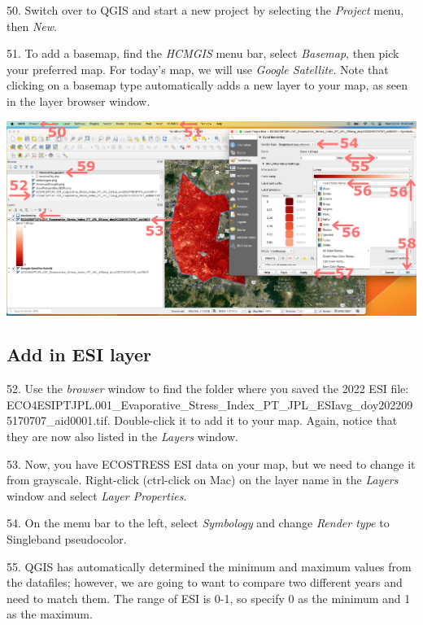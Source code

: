 \documentclass[oneside,a4paper,11pt,explicit]{book}
\begin{document}
50. Switch over to QGIS and start a new project by selecting the \textit{Project} menu, then \textit{New}.

51. To add a basemap, find the \textit{HCMGIS} menu bar, select \textit{Basemap}, then pick your preferred map. For today's map, we will use \textit{Google Satellite}. Note that clicking on a basemap type automatically adds a new layer to your map, as seen in the layer browser window.

\vspace{.5em}

\centerline{\includegraphics[width=\textwidth]{addESIlayer.png}}

\subsection{Add in ESI layer}

52. Use the \textit{browser} window to find the folder where you saved the 2022 ESI file: \\ ECO4ESIPTJPL.001\_Evaporative\_Stress\_Index\_PT\_JPL\_ESIavg\_doy2022095170707\_aid0001.tif. Double-click it to add it to your map. Again, notice that they are now also listed in the \textit{Layers} window.


53. Now, you have ECOSTRESS ESI data on your map, but we need to change it from grayscale. Right-click (ctrl-click on Mac) on the layer name in the \textit{Layers} window and select \textit{Layer Properties}. 

54. On the menu bar to the left, select \textit{Symbology} and change \textit{Render type} to Singleband pseudocolor. 

55. QGIS has automatically determined the minimum and maximum values from the datafiles; however, we are going to want to compare two different years and need to match them. The range of ESI is 0-1, so specify 0 as the minimum and 1 as the maximum. 
\end{document}
